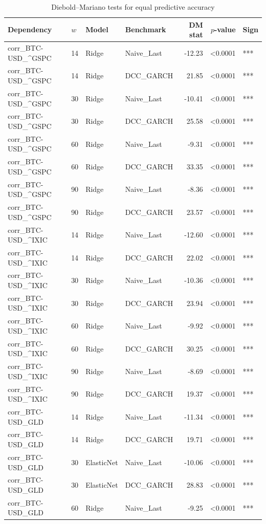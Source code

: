 \begin{table}[H]
\centering
\small
\caption{Diebold--Mariano tests for equal predictive accuracy}
\label{tab:dm_tests}
\begin{tabular}{llllrrl}
\toprule
Dependency & $w$ & Model & Benchmark & DM stat & $p$-value & Sign \\
\midrule
corr_BTC-USD_^GSPC & 14 & Ridge & Naive_Last & -12.23 & <0.0001 & *** \\
corr_BTC-USD_^GSPC & 14 & Ridge & DCC_GARCH & 21.85 & <0.0001 & *** \\
corr_BTC-USD_^GSPC & 30 & Ridge & Naive_Last & -10.41 & <0.0001 & *** \\
corr_BTC-USD_^GSPC & 30 & Ridge & DCC_GARCH & 25.58 & <0.0001 & *** \\
corr_BTC-USD_^GSPC & 60 & Ridge & Naive_Last & -9.31 & <0.0001 & *** \\
corr_BTC-USD_^GSPC & 60 & Ridge & DCC_GARCH & 33.35 & <0.0001 & *** \\
corr_BTC-USD_^GSPC & 90 & Ridge & Naive_Last & -8.36 & <0.0001 & *** \\
corr_BTC-USD_^GSPC & 90 & Ridge & DCC_GARCH & 23.57 & <0.0001 & *** \\
corr_BTC-USD_^IXIC & 14 & Ridge & Naive_Last & -12.60 & <0.0001 & *** \\
corr_BTC-USD_^IXIC & 14 & Ridge & DCC_GARCH & 22.02 & <0.0001 & *** \\
corr_BTC-USD_^IXIC & 30 & Ridge & Naive_Last & -10.36 & <0.0001 & *** \\
corr_BTC-USD_^IXIC & 30 & Ridge & DCC_GARCH & 23.94 & <0.0001 & *** \\
corr_BTC-USD_^IXIC & 60 & Ridge & Naive_Last & -9.92 & <0.0001 & *** \\
corr_BTC-USD_^IXIC & 60 & Ridge & DCC_GARCH & 30.25 & <0.0001 & *** \\
corr_BTC-USD_^IXIC & 90 & Ridge & Naive_Last & -8.69 & <0.0001 & *** \\
corr_BTC-USD_^IXIC & 90 & Ridge & DCC_GARCH & 19.37 & <0.0001 & *** \\
corr_BTC-USD_GLD & 14 & Ridge & Naive_Last & -11.34 & <0.0001 & *** \\
corr_BTC-USD_GLD & 14 & Ridge & DCC_GARCH & 19.71 & <0.0001 & *** \\
corr_BTC-USD_GLD & 30 & ElasticNet & Naive_Last & -10.06 & <0.0001 & *** \\
corr_BTC-USD_GLD & 30 & ElasticNet & DCC_GARCH & 28.83 & <0.0001 & *** \\
corr_BTC-USD_GLD & 60 & Ridge & Naive_Last & -9.25 & <0.0001 & *** \\

\end{tabular}
\end{table}
